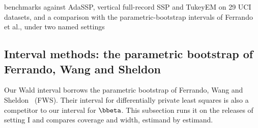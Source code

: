 benchmarks against AdaSSP, vertical full-record SSP and TukeyEM on 29 UCI datasets, and a comparison with the parametric-bootstrap intervals of Ferrando et al., under two named settings

\subsection{Interval methods: the parametric bootstrap of Ferrando, Wang and Sheldon}
\label{sec:eval:fws}

Our Wald interval borrows the parametric bootstrap of Ferrando, Wang and Sheldon~\cite{ferrando2022parametric} (FWS). Their interval for differentially private least squares is also a competitor to our interval for $\bbeta$. This subsection runs it on the releases of setting I and compares coverage and width, estimand by estimand.

